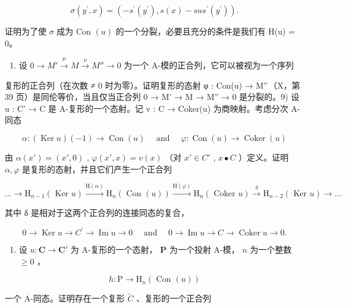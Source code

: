 \[
\sigma (y ^ {\prime}, x) = \left(- s ^ {\prime} (y ^ {\prime}), s (x) - s u s ^ {\prime} (y ^ {\prime})\right).
\]

证明为了使 \(\sigma\) 成为 Con \((u)\) 的一个分裂，必要且充分的条件是我们有 H(u) = 0。

\begin{enumerate}
\def\labelenumi{\arabic{enumi})}
\setcounter{enumi}{7}
\tightlist
\item
  设 \(0 \to M' \xrightarrow{\mu} M \xrightarrow{\nu} M'' \to 0\) 为一个 A-模的正合列，它可以被视为一个序列
\end{enumerate}

复形的正合列（在次数 ≠ 0 时为零）。证明复形的态射 φ : Con(u) → M''\,（X，第 39 页）是同伦等价，当且仅当正合列 0 → M' → M → M'' → 0 是分裂的。9) 设 u : C' → C 是 A-复形的一个态射。记 v : C → Coker(u) 为商映射。考虑分次 A-同态

\[
\alpha : (\operatorname{Ker} u) (- 1) \rightarrow \operatorname{Con} (u) \quad \text { and } \quad \varphi : \operatorname{Con} (u) \rightarrow \operatorname{Coker} (u)
\]

由 \(\alpha(x') = (x', 0)\) , \(\varphi(x', x) = v(x)\) （对 \(x' \in C'\) , \(x \bullet C\) ）定义。证明 \(\alpha, \varphi\) 是复形的态射，并且它们产生一个正合列

\[
\dots \rightarrow \mathrm{H} _ {n - 1} (\text { Ker } u) \xrightarrow {\mathrm{H} (\alpha)} \mathrm{H} _ {n} (\text { Con } (u)) \xrightarrow {\mathrm{H} (\varphi)} \mathrm{H} _ {n} (\text { Coker } u) \xrightarrow {\delta} \mathrm{H} _ {n - 2} (\text { Ker } u) \rightarrow \dots
\]

其中 δ 是相对于这两个正合列的连接同态的复合，

\[
0 \rightarrow \operatorname{Ker} u \rightarrow C ^ {\prime} \rightarrow \operatorname{Im} u \rightarrow 0 \quad \text { and } \quad 0 \rightarrow \operatorname{Im} u \rightarrow C \rightarrow \operatorname{Coker} u \rightarrow 0.
\]

\begin{enumerate}
\def\labelenumi{\arabic{enumi})}
\setcounter{enumi}{9}
\tightlist
\item
  设 \(u: \mathbf{C} \to \mathbf{C}'\) 为 A-复形的一个态射， \(\mathbf{P}\) 为一个投射 A-模， \(n\) 为一个整数 \(\geqslant 0\) ，
\end{enumerate}

\[
h: \mathrm{P} \rightarrow \mathrm{H} _ {n} (\text { Con } (u))
\]

一个 A-同态。证明存在一个复形 \(\tilde{C}\) 、复形的一个正合列

